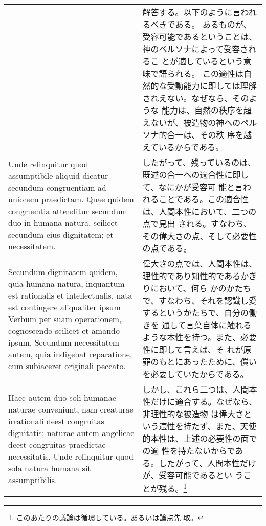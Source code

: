 \documentclass[10pt]{jsarticle} %
\begin{document}
\begin{longtable}{p{21em}p{21em}}
&

解答する。以下のように言われるべきである。
あるものが、受容可能であるということは、神のペルソナによって受容されるこ
 とが適しているという意味で語られる。
この適性は自然的な受動能力に即しては理解されえない。なぜなら、そのような
 能力は、自然の秩序を超えないが、被造物の神へのペルソナ的合一は、その秩
 序を越えているからである。


\\

Unde relinquitur quod assumptibile aliquid dicatur
secundum congruentiam ad unionem praedictam. Quae quidem congruentia
attenditur secundum duo in humana natura, scilicet secundum eius
dignitatem; et necessitatem. 



&

したがって、残っているのは、既述の合一への適合性に即して、なにかが受容可
 能と言われることである。この適合性は、人間本性において、二つの点で見出
 される。すなわち、その偉大さの点、そして必要性の点である。


\\

Secundum dignitatem quidem, quia humana
natura, inquantum est rationalis et intellectualis, nata est contingere
aliqualiter ipsum Verbum per suam operationem, cognoscendo scilicet et
amando ipsum. Secundum necessitatem autem, quia indigebat reparatione,
cum subiaceret originali peccato.


&

偉大さの点では、人間本性は、理性的であり知性的であるかぎりにおいて、何ら
 かのかたちで、すなわち、それを認識し愛するというかたちで、自分の働きを
 通して言葉自体に触れるような本性を持つ。また、必要性に即して言えば、そ
 れが原罪のもとにあったために、償いを必要していたからである。



\\

 Haec autem duo soli humanae naturae
conveniunt, nam creaturae irrationali deest congruitas dignitatis;
naturae autem angelicae deest congruitas praedictae necessitatis. Unde
relinquitur quod sola natura humana sit assumptibilis.


&

しかし、これら二つは、人間本性だけに適合する。なぜなら、非理性的な被造物
 は偉大さという適性を持たず、また、天使的本性は、上述の必要性の面での適
 性を持たないからである。したがって、人間本性だけが、受容可能であるとい
 うことが残る。\footnote{このあたりの議論は循環している。あるいは論点先
 取。}



\end{longtable}
\end{document}
